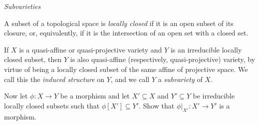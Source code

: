 \label{1.3.10}

\emph{Subvarieties}

A subset of a topological space is \emph{locally closed} if it is an open subset of its closure, or, equivalently, if it is the intersection of an open set with a closed set.

If $X$ is a quasi-affine or quasi-projective variety and $Y$ is an irreducible locally closed subset, then $Y$ is also quasi-affine (respectively, quasi-projective) variety, by virtue of being a locally closed subset of the same affine of projective space. We call this the \emph{induced structure} on $Y$, and we call $Y$ a \emph{subvariety} of $X$.

Now let $\phi: X \longrightarrow Y$ be a morphism and let $X' \subseteq X$ and $Y' \subseteq Y$ be irreducible locally closed subsets such that $\phi[X'] \subseteq Y'$. Show that $\phi|_{X'}: X' \longrightarrow Y'$ is a morphism.

